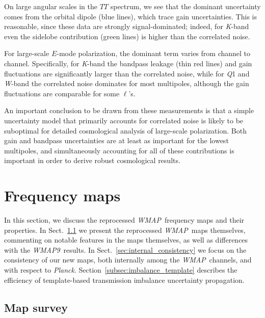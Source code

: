 \documentclass[twocolumn]{../../common/aa}
\def\WMAP{\emph{WMAP}}
\def\WMAPnine{\emph{WMAP9}}
\def\Planck{\emph{Planck}}
\newcommand{\K}[0]{\textit K}
\newcommand{\Q}[0]{\textit Q}
\newcommand{\W}[0]{\textit W}
\begin{document}
On large angular scales in the $TT$ spectrum, we see that the dominant uncertainty comes from the orbital dipole (blue lines), which trace gain uncertainties. This is reasonable, since these data are strongly signal-dominated; indeed, for \K-band even the sidelobe contribution (green lines) is higher than the correlated noise.

For large-scale $E$-mode polarization, the dominant term varies from channel to channel. Specifically, for \K-band the bandpass leakage (thin red lines) and gain fluctuations are significantly larger than the correlated noise, while for \Q1 and \W-band the correlated noise dominates for most multipoles, although the gain fluctuations are comparable for some $\ell$'s.

An important conclusion to be drawn from these measurements is that a simple uncertainty model that primarily accounts for correlated noise is likely to be suboptimal for detailed cosmological analysis of large-scale polarization. Both gain and bandpass uncertainties are at least as important for the lowest multipoles, and simultaneously accounting for all of these contributions is important in order to derive robust cosmological results.






\section{Frequency maps}
\label{sec:maps}

In this section, we discuss the reprocessed \WMAP\ frequency maps and their properties. In Sect.~\ref{ssec:means} we present the reprocessed \WMAP\ maps themselves, commenting on notable features in the maps themselves, as well as differences with the \WMAPnine\ results. In Sect.~\ref{sec:internal_consistency} we focus on the consistency of our new maps, both internally among the \WMAP\ channels, and with respect to \Planck. Section~\ref{subsec:imbalance_template} describes the efficiency of template-based transmission imbalance uncertainty propagation.

\subsection{Map survey}
\label{ssec:means}
\end{document}
